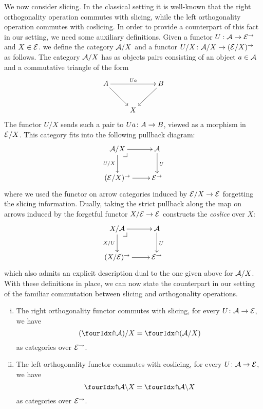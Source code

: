 \documentclass[reqno,10pt,a4paper,oneside]{amsart}
\begin{document}
We now consider slicing. In the classical setting it is well-known that the right orthogonality operation commutes with slicing, while the left orthogonality operation commutes with coslicing.  In order to provide a counterpart of this fact in our setting, we need some auxiliary definitions. Given a functor $U : \cal{A} \to \catE^{\to}$ and $X \in \catE$.  we define the category $\cal{A}/X$
and a functor $U/X \co \cal{A}/X \to (\cal{E}/X)^\to$ as follows. The category $\cal{A}/X$ has as objects pairs consisting of an object $a \in \cal{A}$ and a commutative triangle of the form
\[
\xymatrix{
A \ar[dr] \ar[rr]^{Ua} & & B  \ar[dl] \\
 & X }
 \]
The functor $U/X$ sends such a pair to $Ua \co A \to B$, viewed as a morphism in $\cal{E}/X$. This category fits into the
following pullback diagram:
\[
\xymatrix{
  \cal{A}/X
  \ar[r]
  \ar[d]_{U/X}
  \pullback{dr}
&
  \cal{A}
  \ar[d]^{U}
\\
  (\catE/X)^{\to}
  \ar[r]
&
  \catE^{\to}
}
\]
where we used the functor on arrow categories induced by $\catE/X \to \catE$ forgetting the slicing information.  Dually, taking the strict pullback along the map on arrows induced by the forgetful functor $X/\cal{E} \to \catE$ constructs the \emph{coslice} over $X$:
\[
\xymatrix{
  X/\cal{A}
  \ar[r]
  \ar[d]_{X/U}
  \pullback{dr}
&
  \cal{A}
  \ar[d]^{U}
\\
  (X/\catE)^{\to}
  \ar[r]
&
  \catE^{\to}
}
\]
which also admits an explicit description dual to the one given above for $\cal{A}/X$. With these definitions in place, we can now state the counterpart in our setting of the familiar commutation between slicing and orthogonality operations. 



\begin{proposition} \hfill 
\label{pitchfork-slicing}
\begin{enumerate}[(i)]
\item The right orthogonality functor commutes with slicing, \ie for every $U \co \cal{A} \to \cal{E}$, we have
\[
  (\liftr{\cal{A}})/X = \liftr{(\cal{A}/X)}
\]
as categories over $\cal{E}^\to$.
\item The left orthogonality functor commutes with coslicing, \ie for every $U \co \cal{A} \to \cal{E}$, we have
\[
 \liftl{\cal{A}} \backslash X = \liftl{\cal{A} \backslash X}
\]
as categories over $\cal{E}^\to$.
\end{enumerate}
\end{proposition}
\end{document}
